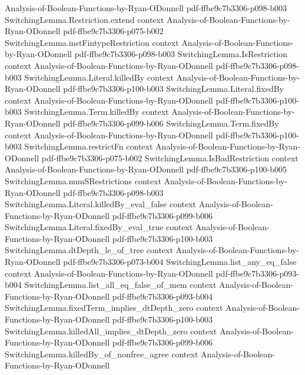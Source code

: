 \begin{lemma}
  {Analysis-of-Boolean-Functions-by-Ryan-ODonnell}
  {pdf-ffbe9c7b3306-p098-b003}
\proofstep
  {SwitchingLemma.Restriction.extend}
  {context}
  {Analysis-of-Boolean-Functions-by-Ryan-ODonnell}
  {pdf-ffbe9c7b3306-p075-b002}
\proofstep
  {SwitchingLemma.instFintypeRestriction}
  {context}
  {Analysis-of-Boolean-Functions-by-Ryan-ODonnell}
  {pdf-ffbe9c7b3306-p098-b003}
\proofstep
  {SwitchingLemma.IsRestriction}
  {context}
  {Analysis-of-Boolean-Functions-by-Ryan-ODonnell}
  {pdf-ffbe9c7b3306-p098-b003}
\proofstep
  {SwitchingLemma.Literal.killedBy}
  {context}
  {Analysis-of-Boolean-Functions-by-Ryan-ODonnell}
  {pdf-ffbe9c7b3306-p100-b003}
\proofstep
  {SwitchingLemma.Literal.fixedBy}
  {context}
  {Analysis-of-Boolean-Functions-by-Ryan-ODonnell}
  {pdf-ffbe9c7b3306-p100-b003}
\proofstep
  {SwitchingLemma.Term.killedBy}
  {context}
  {Analysis-of-Boolean-Functions-by-Ryan-ODonnell}
  {pdf-ffbe9c7b3306-p099-b006}
\proofstep
  {SwitchingLemma.Term.fixedBy}
  {context}
  {Analysis-of-Boolean-Functions-by-Ryan-ODonnell}
  {pdf-ffbe9c7b3306-p100-b003}
\proofstep
  {SwitchingLemma.restrictFn}
  {context}
  {Analysis-of-Boolean-Functions-by-Ryan-ODonnell}
  {pdf-ffbe9c7b3306-p075-b002}
\proofstep
  {SwitchingLemma.IsBadRestriction}
  {context}
  {Analysis-of-Boolean-Functions-by-Ryan-ODonnell}
  {pdf-ffbe9c7b3306-p100-b005}
\proofstep
  {SwitchingLemma.numSRestrictions}
  {context}
  {Analysis-of-Boolean-Functions-by-Ryan-ODonnell}
  {pdf-ffbe9c7b3306-p098-b003}
\proofstep
  {SwitchingLemma.Literal.killedBy_eval_false}
  {context}
  {Analysis-of-Boolean-Functions-by-Ryan-ODonnell}
  {pdf-ffbe9c7b3306-p099-b006}
\proofstep
  {SwitchingLemma.Literal.fixedBy_eval_true}
  {context}
  {Analysis-of-Boolean-Functions-by-Ryan-ODonnell}
  {pdf-ffbe9c7b3306-p100-b003}
\proofstep
  {SwitchingLemma.dtDepth_le_of_tree}
  {context}
  {Analysis-of-Boolean-Functions-by-Ryan-ODonnell}
  {pdf-ffbe9c7b3306-p073-b004}
\proofstep
  {SwitchingLemma.list_any_eq_false}
  {context}
  {Analysis-of-Boolean-Functions-by-Ryan-ODonnell}
  {pdf-ffbe9c7b3306-p093-b004}
\proofstep
  {SwitchingLemma.list_all_eq_false_of_mem}
  {context}
  {Analysis-of-Boolean-Functions-by-Ryan-ODonnell}
  {pdf-ffbe9c7b3306-p093-b004}
\proofstep
  {SwitchingLemma.fixedTerm_implies_dtDepth_zero}
  {context}
  {Analysis-of-Boolean-Functions-by-Ryan-ODonnell}
  {pdf-ffbe9c7b3306-p100-b003}
\proofstep
  {SwitchingLemma.killedAll_implies_dtDepth_zero}
  {context}
  {Analysis-of-Boolean-Functions-by-Ryan-ODonnell}
  {pdf-ffbe9c7b3306-p099-b006}
\proofstep
  {SwitchingLemma.killedBy_of_nonfree_agree}
  {context}
  {Analysis-of-Boolean-Functions-by-Ryan-ODonnell}

\end{lemma}
